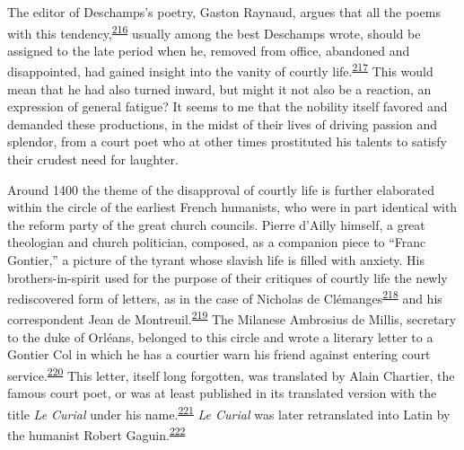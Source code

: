 The editor of Deschamps's poetry, Gaston Raynaud, argues that all the
poems with this
tendency,\textsuperscript{\protect\hypertarget{10_Chapter_Three__THE_HEROIC_DREAM.xhtmlux5cux23id_1505}{\protect\hyperlink{23_NOTES.xhtmlux5cux23id_1506}{216}}}
usually among the best Deschamps wrote, should be assigned to the late
period when he, removed from office, abandoned and disappointed, had
gained insight into the vanity of courtly
life.\textsuperscript{\protect\hypertarget{10_Chapter_Three__THE_HEROIC_DREAM.xhtmlux5cux23id_1503}{\protect\hyperlink{23_NOTES.xhtmlux5cux23id_1504}{217}}}
This would mean that he had also turned inward, but might it not also be
a reaction, an expression of general fatigue? It seems to me that the
nobility itself favored and demanded these productions, in the midst of
their lives of driving passion and splendor, from a court poet who at
other times prostituted his talents to satisfy their crudest need for
laughter.

Around 1400 the theme of the disapproval of courtly life is further
elaborated within the circle of the earliest French humanists, who were
in part identical with the reform party of the great church councils.
Pierre d'Ailly himself, a great theologian and church politician,
composed, as a companion piece to ``Franc Gontier,'' a picture of the
tyrant whose slavish life is filled with anxiety. His brothers-in-spirit
used for the purpose of their critiques of courtly life the newly
rediscovered form of letters, as in the case of Nicholas de
Clémanges\textsuperscript{\protect\hypertarget{10_Chapter_Three__THE_HEROIC_DREAM.xhtmlux5cux23id_1501}{\protect\hyperlink{23_NOTES.xhtmlux5cux23id_1502}{218}}}
and his correspondent Jean de
Montreuil.\textsuperscript{\protect\hypertarget{10_Chapter_Three__THE_HEROIC_DREAM.xhtmlux5cux23id_1499}{\protect\hyperlink{23_NOTES.xhtmlux5cux23id_1500}{219}}}
The Milanese Ambrosius de Millis, secretary to the duke of Orléans,
belonged to this circle and wrote a literary letter to a Gontier Col in
which he has a courtier warn his friend against entering court
service.\textsuperscript{\protect\hypertarget{10_Chapter_Three__THE_HEROIC_DREAM.xhtmlux5cux23id_1497}{\protect\hyperlink{23_NOTES.xhtmlux5cux23id_1498}{220}}}
This letter, itself long forgotten, was translated by Alain Chartier,
the famous court poet, or was at least published in its translated
version with the title \emph{Le Curial} under his
name.\textsuperscript{\protect\hypertarget{10_Chapter_Three__THE_HEROIC_DREAM.xhtmlux5cux23id_1495}{\protect\hyperlink{23_NOTES.xhtmlux5cux23id_1496}{221}}}
\emph{Le Curial} was later retranslated into Latin by the humanist
Robert
Gaguin.\textsuperscript{\protect\hypertarget{10_Chapter_Three__THE_HEROIC_DREAM.xhtmlux5cux23id_1493}{\protect\hyperlink{23_NOTES.xhtmlux5cux23id_1494}{222}}}

